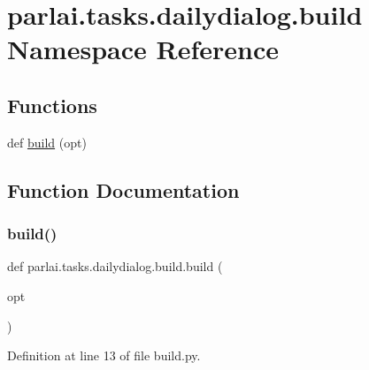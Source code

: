 \hypertarget{namespaceparlai_1_1tasks_1_1dailydialog_1_1build}{}\section{parlai.\+tasks.\+dailydialog.\+build Namespace Reference}
\label{namespaceparlai_1_1tasks_1_1dailydialog_1_1build}
\subsection*{Functions}
\begin{DoxyCompactItemize}
\item 
def \hyperlink{namespaceparlai_1_1tasks_1_1dailydialog_1_1build_a04bbf27e3a854b42e42d2b6b3c4707a0}{build} (opt)
\end{DoxyCompactItemize}


\subsection{Function Documentation}
\mbox{\label{namespaceparlai_1_1tasks_1_1dailydialog_1_1build_a04bbf27e3a854b42e42d2b6b3c4707a0}} 
\subsubsection{\texorpdfstring{build()}{build()}}
{\footnotesize\ttfamily def parlai.\+tasks.\+dailydialog.\+build.\+build (\begin{DoxyParamCaption}\item[{}]{opt }\end{DoxyParamCaption})}



Definition at line 13 of file build.\+py.

